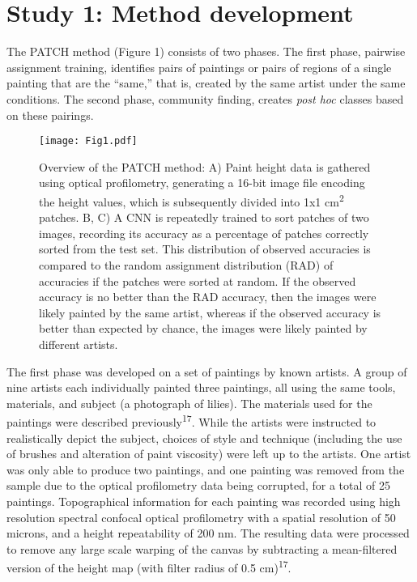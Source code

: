 \documentclass[11pt]{article}
\begin{document}
\section*{Study 1: Method development}

The PATCH method (Figure 1) consists of two phases. The first phase, pairwise
assignment training, identifies pairs of paintings or pairs of regions
of a single painting that are the ``same,'' that is, created by the same
artist under the same conditions. The second phase, community finding,
creates \emph{post hoc} classes based on these pairings.

\begin{figure}[t]
\texttt{[image: Fig1.pdf]}
\caption{Overview of the PATCH method: A) Paint height data is
gathered using optical profilometry, generating a 16-bit image file
encoding the height values, which is subsequently divided into
1x1 cm\textsuperscript{2} patches. B, C) A CNN is repeatedly trained
to sort patches of two images, recording its accuracy as a percentage of
patches correctly sorted from the test set. This distribution of
observed accuracies is compared to the random assignment distribution
(RAD) of accuracies if the patches were sorted at random. If the
observed accuracy is no better than the RAD accuracy, then the images
were likely painted by the same artist, whereas if the observed accuracy
is better than expected by chance, the images were likely painted by
different artists.}
\end{figure}


The first phase was developed on a set of paintings by known artists. A
group of nine artists each individually painted three paintings, all
using the same tools, materials, and subject (a photograph of lilies).
The materials used for the paintings were described
previously\textsuperscript{17}. While the artists were instructed to
realistically depict the subject, choices of style and technique
(including the use of brushes and alteration of paint viscosity) were
left up to the artists. One artist was only able to produce two
paintings, and one painting was removed from the sample due to the
optical profilometry data being corrupted, for a total of 25 paintings.
Topographical information for each painting was recorded using high
resolution spectral confocal optical profilometry with a spatial
resolution of 50 microns, and a height repeatability of 200 nm. The resulting data were processed to remove any large scale warping
of the canvas by subtracting a mean-filtered version of the height map
(with filter radius of 0.5 cm)\textsuperscript{17}.
\end{document}
